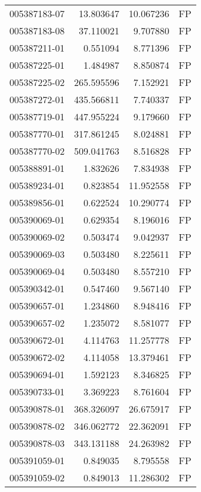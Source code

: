 \begin{tabular}{lrrl}
005387183-07 &   13.803647 &      10.067236 &   FP \\
005387183-08 &   37.110021 &       9.707880 &   FP \\
005387211-01 &    0.551094 &       8.771396 &   FP \\
005387225-01 &    1.484987 &       8.850874 &   FP \\
005387225-02 &  265.595596 &       7.152921 &   FP \\
005387272-01 &  435.566811 &       7.740337 &   FP \\
005387719-01 &  447.955224 &       9.179660 &   FP \\
005387770-01 &  317.861245 &       8.024881 &   FP \\
005387770-02 &  509.041763 &       8.516828 &   FP \\
005388891-01 &    1.832626 &       7.834938 &   FP \\
005389234-01 &    0.823854 &      11.952558 &   FP \\
005389856-01 &    0.622524 &      10.290774 &   FP \\
005390069-01 &    0.629354 &       8.196016 &   FP \\
005390069-02 &    0.503474 &       9.042937 &   FP \\
005390069-03 &    0.503480 &       8.225611 &   FP \\
005390069-04 &    0.503480 &       8.557210 &   FP \\
005390342-01 &    0.547460 &       9.567140 &   FP \\
005390657-01 &    1.234860 &       8.948416 &   FP \\
005390657-02 &    1.235072 &       8.581077 &   FP \\
005390672-01 &    4.114763 &      11.257778 &   FP \\
005390672-02 &    4.114058 &      13.379461 &   FP \\
005390694-01 &    1.592123 &       8.346825 &   FP \\
005390733-01 &    3.369223 &       8.761604 &   FP \\
005390878-01 &  368.326097 &      26.675917 &   FP \\
005390878-02 &  346.062772 &      22.362091 &   FP \\
005390878-03 &  343.131188 &      24.263982 &   FP \\
005391059-01 &    0.849035 &       8.795558 &   FP \\
005391059-02 &    0.849013 &      11.286302 &   FP \\

\end{tabular}
